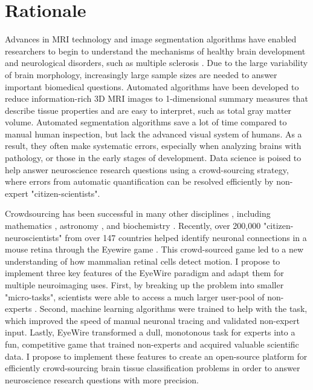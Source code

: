 \section*{Rationale}

Advances in MRI technology and image segmentation algorithms have enabled researchers to begin to understand the mechanisms of healthy brain development \cite{giedd1999brain} and neurological disorders, such as multiple sclerosis \cite{bakshi2008mri}. Due to the large variability of brain morphology, increasingly large sample sizes are needed to answer important biomedical questions. Automated algorithms have been developed to reduce information-rich 3D MRI images to 1-dimensional summary measures that describe tissue properties and are easy to interpret, such as total gray matter volume. Automated  segmentation algorithms save a lot of time compared to manual human inspection, but lack the advanced visual system of humans. As a result, they often make systematic errors, especially when analyzing brains with pathology, or those in the early stages of development. Data science is poised to help answer neuroscience research questions using a crowd-sourcing strategy, where errors from automatic quantification can be resolved efficiently by non-expert "citizen-scientists".

Crowdsourcing has been successful in many other disciplines \cite{wiggins2011conservation}, including mathematics \cite{cranshaw2011polymath}, astronomy \cite{lintott2008galaxy}, and biochemistry \cite{eiben2012increased} . Recently, over 200,000 "citizen-neuroscientists"  from over 147 countries helped identify neuronal connections in a mouse retina through the Eyewire game \cite{kim2014space}. This crowd-sourced game led to a new understanding of how mammalian retinal cells detect motion. I propose to implement three key features of the EyeWire paradigm and adapt them for multiple neuroimaging uses. First, by breaking up the problem into smaller "micro-tasks", scientists were able to access a much larger user-pool of non-experts \cite{kittur2008crowdsourcing}. Second, machine learning algorithms were trained to help with the task, which improved the speed of manual neuronal tracing and validated non-expert input. Lastly, EyeWire transformed a dull, monotonous task for experts into a fun, competitive game that trained non-experts and acquired valuable scientific data. I propose to implement these features to create an open-source platform for efficiently crowd-sourcing brain tissue classification problems in order to answer neuroscience research questions with more precision.

